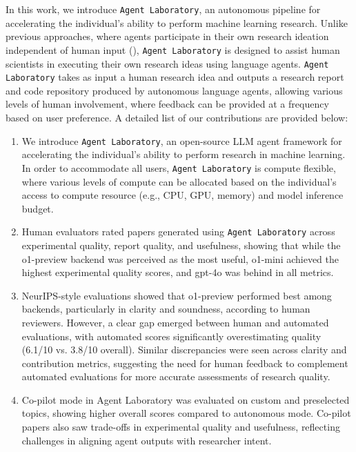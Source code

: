 \documentclass[11pt, a4paper]{gdm_format}
\begin{document}
In this work, we introduce \texttt{Agent Laboratory}, an autonomous pipeline for accelerating the individual’s ability to perform machine learning research. Unlike previous approaches, where agents participate in their own research ideation independent of human input (\cite{lu2024aiscientist, baek2024researchagent}), \texttt{Agent Laboratory} is designed to assist human scientists in executing their own research ideas using language agents. \texttt{Agent Laboratory} takes as input a human research idea and outputs a research report and code repository produced by autonomous language agents, allowing various levels of human involvement, where feedback can be provided at a frequency based on user preference. A detailed list of our contributions are provided below:



\begin{enumerate}
    \item We introduce \texttt{Agent Laboratory}, an open-source LLM agent framework for accelerating the individual’s ability to perform research in machine learning. In order to accommodate all users, \texttt{Agent Laboratory} is compute flexible, where various levels of compute can be allocated based on the individual's access to compute resource (e.g., CPU, GPU, memory) and model inference budget.
    \item Human evaluators rated papers generated using \texttt{Agent Laboratory} across experimental quality, report quality, and usefulness, showing that while the o1-preview backend was perceived as the most useful, o1-mini achieved the highest experimental quality scores, and gpt-4o was behind in all metrics.
    \item NeurIPS-style evaluations showed that o1-preview performed best among backends, particularly in clarity and soundness, according to human reviewers. However, a clear gap emerged between human and automated evaluations, with automated scores significantly overestimating quality (6.1/10 vs. 3.8/10 overall). Similar discrepancies were seen across clarity and contribution metrics, suggesting the need for human feedback to complement automated evaluations for more accurate assessments of research quality.
    \item Co-pilot mode in Agent Laboratory was evaluated on custom and preselected topics, showing higher overall scores compared to autonomous mode. Co-pilot  papers also saw trade-offs in experimental quality and usefulness, reflecting challenges in aligning agent outputs with researcher intent.

\end{enumerate}
\end{document}
